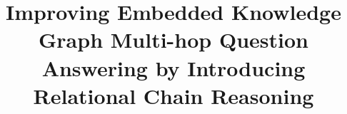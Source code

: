 \documentclass[pdflatex,sn-mathphys]{sn-jnl}%
\theoremstyle{thmstyleone}%
\theoremstyle{thmstyletwo}%
\theoremstyle{thmstylethree}%
\begin{document}
\title[Relational Chain Reasoning Improved Embedded KGQA]{Improving Embedded Knowledge Graph Multi-hop Question Answering by Introducing Relational Chain Reasoning}












\end{document}
